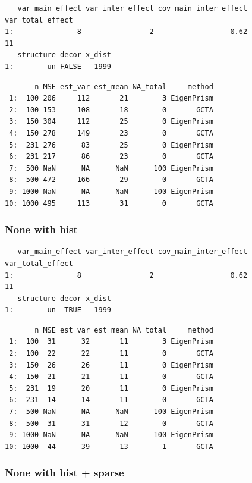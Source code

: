 \documentclass[]{article}
\begin{document}
\begin{verbatim}
   var_main_effect var_inter_effect cov_main_inter_effect var_total_effect
1:               8                2                  0.62               11
   structure decor x_dist
1:        un FALSE   1999
\end{verbatim}

\begin{verbatim}
       n MSE est_var est_mean NA_total     method
 1:  100 206     112       21        3 EigenPrism
 2:  100 153     108       18        0       GCTA
 3:  150 304     112       25        0 EigenPrism
 4:  150 278     149       23        0       GCTA
 5:  231 276      83       25        0 EigenPrism
 6:  231 217      86       23        0       GCTA
 7:  500 NaN      NA      NaN      100 EigenPrism
 8:  500 472     166       29        0       GCTA
 9: 1000 NaN      NA      NaN      100 EigenPrism
10: 1000 495     113       31        0       GCTA
\end{verbatim}

\subsubsection{None with hist}\label{none-with-hist}

\begin{verbatim}
   var_main_effect var_inter_effect cov_main_inter_effect var_total_effect
1:               8                2                  0.62               11
   structure decor x_dist
1:        un  TRUE   1999
\end{verbatim}

\begin{verbatim}
       n MSE est_var est_mean NA_total     method
 1:  100  31      32       11        3 EigenPrism
 2:  100  22      22       11        0       GCTA
 3:  150  26      26       11        0 EigenPrism
 4:  150  21      21       11        0       GCTA
 5:  231  19      20       11        0 EigenPrism
 6:  231  14      14       11        0       GCTA
 7:  500 NaN      NA      NaN      100 EigenPrism
 8:  500  31      31       12        0       GCTA
 9: 1000 NaN      NA      NaN      100 EigenPrism
10: 1000  44      39       13        1       GCTA
\end{verbatim}

\subsubsection{None with hist + sparse}\label{none-with-hist-sparse}
\end{document}
